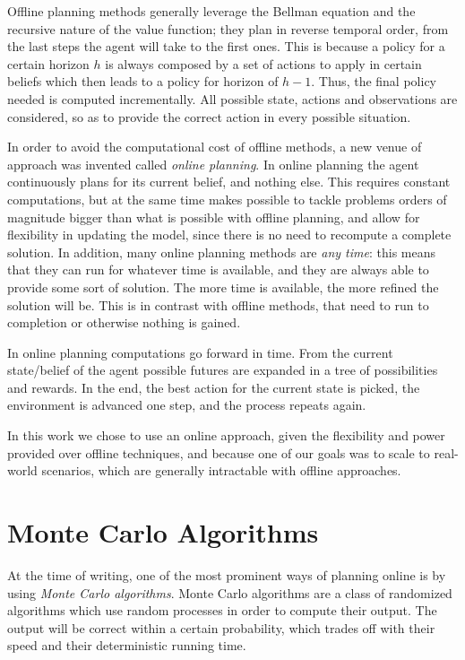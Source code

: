 Offline planning methods generally leverage the Bellman equation and the recursive nature of the
value function; they plan in reverse temporal order, from the last steps the agent will take to the
first ones. This is because a policy for a certain horizon $h$ is always composed by a set of
actions to apply in certain beliefs which then leads to a policy for horizon of $h-1$. Thus, the
final policy needed is computed incrementally. All possible state, actions and observations are
considered, so as to provide the correct action in every possible situation.

In order to avoid the computational cost of offline methods, a new venue of approach was invented
called \textit{online planning}. In online planning the agent continuously plans for its current
belief, and nothing else. This requires constant computations, but at the same time makes possible
to tackle problems orders of magnitude bigger than what is possible with offline planning, and allow
for flexibility in updating the model, since there is no need to recompute a complete solution. In
addition, many online planning methods are \textit{any time}: this means that they can run for
whatever time is available, and they are always able to provide some sort of solution. The more time
is available, the more refined the solution will be. This is in contrast with offline methods, that
need to run to completion or otherwise nothing is gained.

In online planning computations go forward in time. From the current state/belief of the agent
possible futures are expanded in a tree of possibilities and rewards. In the end, the best action
for the current state is picked, the environment is advanced one step, and the process repeats
again.

In this work we chose to use an online approach, given the flexibility and power provided over
offline techniques, and because one of our goals was to scale to real-world scenarios, which are
generally intractable with offline approaches.

\section{Monte Carlo Algorithms}

At the time of writing, one of the most prominent ways of planning online is by using \textit{Monte
Carlo algorithms}. Monte Carlo algorithms are a class of randomized algorithms which use random
processes in order to compute their output. The output will be correct within a certain probability,
which trades off with their speed and their deterministic running time.

